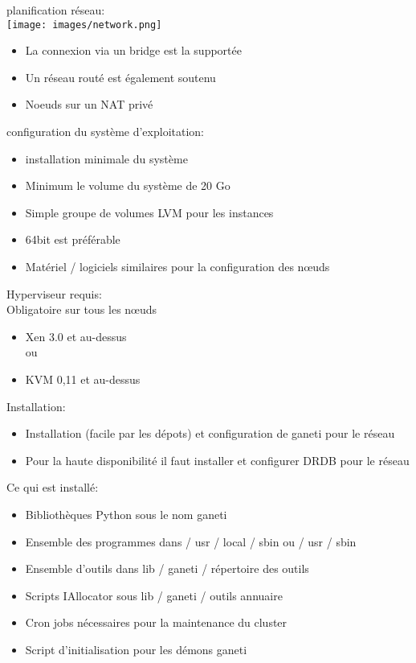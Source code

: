 \documentclass{beamer}
\begin{document}
\begin{frame}
planification réseau:\\
\texttt{[image: images/network.png]}
\begin{itemize}
\item La connexion via un bridge est la supportée
\item Un réseau routé est également soutenu
\item Noeuds sur un NAT privé
\end{itemize}
\end{frame}

\begin{frame}
configuration du système d'exploitation:\\
\begin{itemize}
\item installation minimale du système
\item Minimum le volume du système de 20 Go
\item Simple groupe de volumes LVM pour les instances
\item 64bit est préférable
\item Matériel / logiciels similaires pour la configuration des nœuds
\end{itemize}
\end{frame}

\begin{frame}
Hyperviseur requis:\\
Obligatoire sur tous les nœuds
\begin{itemize}
\item Xen 3.0 et au-dessus \\ou
\item KVM 0,11 et au-dessus
\end{itemize}
\end{frame}

\begin{frame}
Installation:\\
\begin{itemize}
\item Installation (facile par les dépots) et configuration de ganeti pour le réseau
\item Pour la haute disponibilité il faut installer et configurer DRDB pour le réseau
\end{itemize}
\end{frame}

\begin{frame}
Ce qui est installé:\\
\begin{itemize}
\item Bibliothèques Python sous le nom ganeti
\item Ensemble des programmes dans / usr / local / sbin ou / usr / sbin
\item Ensemble d'outils dans lib / ganeti / répertoire des outils
\item Scripts IAllocator sous lib / ganeti / outils annuaire
\item Cron jobs nécessaires pour la maintenance du cluster
\item Script d'initialisation pour les démons ganeti
\end{itemize}
\end{frame}
\end{document}
